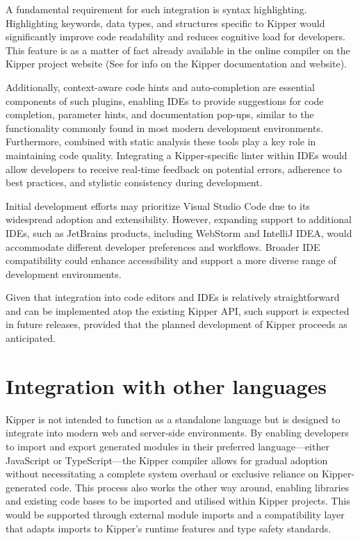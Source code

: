 A fundamental requirement for such integration is syntax highlighting. Highlighting keywords, data types, and structures specific to Kipper would significantly improve code readability and reduces cognitive load for developers. This feature is as a matter of fact already available in the online compiler on the Kipper project website (See  for info on the Kipper documentation and website). 

Additionally, context-aware code hints and auto-completion are essential components of such plugins, enabling IDEs to provide suggestions for code completion, parameter hints, and documentation pop-ups, similar to the functionality commonly found in most modern development environments. Furthermore, combined with static analysis these tools play a key role in maintaining code quality. Integrating a Kipper-specific linter within IDEs would allow developers to receive real-time feedback on potential errors, adherence to best practices, and stylistic consistency during development.

Initial development efforts may prioritize Visual Studio Code due to its widespread adoption and extensibility. However, expanding support to additional IDEs, such as JetBrains products, including WebStorm and IntelliJ IDEA, would accommodate different developer preferences and workflows. Broader IDE compatibility could enhance accessibility and support a more diverse range of development environments.

Given that integration into code editors and IDEs is relatively straightforward and can be implemented atop the existing Kipper API, such support is expected in future releases, provided that the planned development of Kipper proceeds as anticipated.

\section{Integration with other languages}

Kipper is not intended to function as a standalone language but is designed to integrate into modern web and server-side environments. By enabling developers to import and export generated modules in their preferred language—either JavaScript or TypeScript—the Kipper compiler allows for gradual adoption without necessitating a complete system overhaul or exclusive reliance on Kipper-generated code. This process also works the other way around, enabling libraries and existing code bases to be imported and utilised within Kipper projects. This would be supported through external module imports and a compatibility layer that adapts imports to Kipper’s runtime features and type safety standards.

